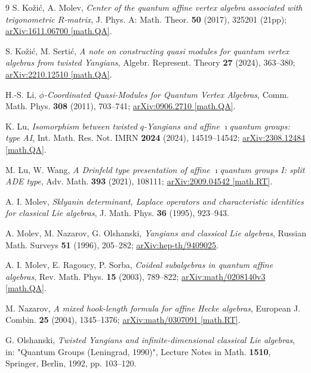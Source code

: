 \documentclass[12pt,a4paper,reqno]{amsart}
\theoremstyle{stil}
\theoremstyle{defi}
\theoremstyle{defi}
\theoremstyle{stil}
\theoremstyle{stil}
\theoremstyle{stil}
\theoremstyle{prim}
\begin{document}
\begin{thebibliography}{9}
S. Ko\v{z}i\'{c}, A. Molev, 
{\em Center of the quantum affine vertex algebra associated with trigonometric $R$-matrix}, 
J. Phys. A: Math. Theor. \textbf{50} (2017), 325201 (21pp); 
\href{https://arxiv.org/abs/1611.06700}{arXiv:1611.06700 [math.QA]}.

S. Ko\v{z}i\'{c}, M. Sertić, 
{\em A note on constructing quasi modules for quantum vertex algebras from twisted Yangians}, 
Algebr. Represent. Theory \textbf{27} (2024), 363--380; 
\href{https://arxiv.org/abs/2210.12510}{arXiv:2210.12510 [math.QA]}.

H.-S. Li,
{\em $\phi$-Coordinated Quasi-Modules for Quantum Vertex Algebras},
Comm. Math. Phys. {\bf 308} (2011), 703--741;
\href{https://arxiv.org/abs/0906.2710}{arXiv:0906.2710 [math.QA]}.

K. Lu,
{\em Isomorphism between twisted $q$-Yangians and affine $\imath$quantum groups: type AI},
 	Int. Math. Res. Not. IMRN \textbf{2024} (2024),  14519--14542;
\href{https://arxiv.org/abs/2308.12484}{arXiv:2308.12484 [math.QA]}.

M. Lu, W. Wang,
{\em A Drinfeld type presentation of affine $\imath$quantum groups I: split ADE type},
  	Adv. Math. \textbf{393} (2021), 108111;
\href{https://arxiv.org/abs/2009.04542}{arXiv:2009.04542 [math.RT]}.

A. I. Molev, 
{\em Sklyanin determinant, Laplace operators and characteristic identities for classical Lie algebras}, J. Math. Phys. \textbf{36} (1995), 923--943.

A. Molev, M. Nazarov, G. Olshanski, 
{\em Yangians and classical Lie algebras}, 
Russian Math. Surveys \textbf{51} (1996), 205--282;
\href{https://arxiv.org/abs/hep-th/9409025}{arXiv:hep-th/9409025}.
 
A. I. Molev, E. Ragoucy, P. Sorba, {\em Coideal subalgebras in quantum affine algebras}, Rev. Math. Phys. \textbf{15} (2003), 789--822;
\href{https://arxiv.org/abs/math/0208140}{arXiv:math/0208140v3 [math.QA]}.

M. Nazarov, 
{\em A mixed hook-length formula for affine Hecke algebras}, 
European J. Combin. \textbf{25} (2004), 1345--1376;
\href{https://arxiv.org/abs/math/0307091}{arXiv:math/0307091 [math.RT]}.

G. Olshanski, 
{\em Twisted Yangians and infinite-dimensional classical Lie algebras}, in: 
"Quantum Groups (Leningrad, 1990)", Lecture Notes in Math. \textbf{1510}, Springer, Berlin, 1992,
pp. 103--120.


\end{thebibliography}
\end{document}
